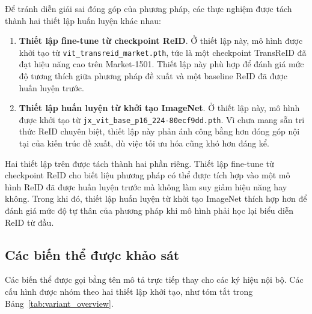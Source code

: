 Để tránh diễn giải sai đóng góp của phương pháp, các thực nghiệm được tách thành hai thiết lập huấn luyện khác nhau:

\begin{enumerate}
    \item \textbf{Thiết lập fine-tune từ checkpoint ReID}. Ở thiết lập này, mô hình được khởi tạo từ \texttt{vit\_transreid\_market.pth}, tức là một checkpoint TransReID đã đạt hiệu năng cao trên Market-1501. Thiết lập này phù hợp để đánh giá mức độ tương thích giữa phương pháp đề xuất và một baseline ReID đã được huấn luyện trước.
    \item \textbf{Thiết lập huấn luyện từ khởi tạo ImageNet}. Ở thiết lập này, mô hình được khởi tạo từ \texttt{jx\_vit\_base\_p16\_224-80ecf9dd.pth}. Vì chưa mang sẵn tri thức ReID chuyên biệt, thiết lập này phản ánh công bằng hơn đóng góp nội tại của kiến trúc đề xuất, dù việc tối ưu hóa cũng khó hơn đáng kể.
\end{enumerate}

Hai thiết lập trên được tách thành hai phần riêng. Thiết lập fine-tune từ checkpoint ReID cho biết liệu phương pháp có thể được tích hợp vào một mô hình ReID đã được huấn luyện trước mà không làm suy giảm hiệu năng hay không. Trong khi đó, thiết lập huấn luyện từ khởi tạo ImageNet thích hợp hơn để đánh giá mức độ tự thân của phương pháp khi mô hình phải học lại biểu diễn ReID từ đầu.

\subsection{Các biến thể được khảo sát}

Các biến thể được gọi bằng tên mô tả trực tiếp thay cho các ký hiệu nội bộ. Các cấu hình được nhóm theo hai thiết lập khởi tạo, như tóm tắt trong Bảng~\ref{tab:variant_overview}.

